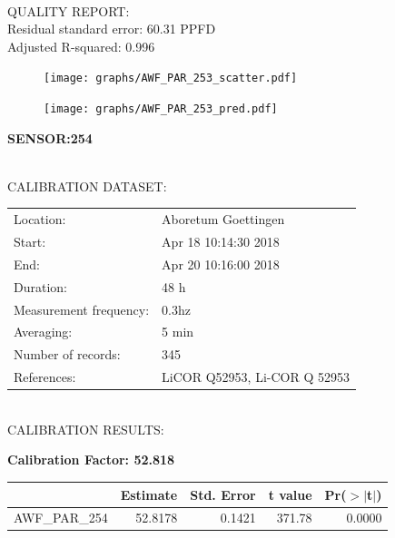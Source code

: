 \documentclass[oneside]{report}
\begin{document}
\hrulefill\\
QUALITY REPORT:\\
Residual standard error: 60.31 PPFD\\
Adjusted R-squared: 0.996



\begin{figure}[H]
  \centering
  \texttt{[image: graphs/AWF\_PAR\_253\_scatter.pdf]}
\end{figure}




\begin{figure}[H]
  \centering
  \texttt{[image: graphs/AWF\_PAR\_253\_pred.pdf]}
\end{figure}

\pagebreak


\begin{center}
\large{\textbf{SENSOR:254}}\\
\end{center}

\hrulefill\\
CALIBRATION DATASET:\\
\begin{table}[h!]
  \centering
  \label{tab:table1}
  \begin{tabular}{ll}
    Location: & Aboretum Goettingen\\ 
    
    
    Start:  & Apr 18 10:14:30 2018 \\
    End:   & Apr 20 10:16:00 2018\\ 
    Duration: & 48 h\\
    Measurement frequency: & 0.3hz\\
    Averaging:  &5 min\\
    Number of records: & 345 \\
    References: & LiCOR Q52953, Li-COR Q 52953 \\
  \end{tabular}
\end{table}

\hrulefill\\
CALIBRATION RESULTS:\\


\begin{center}
\textbf{\large{Calibration Factor: 52.818}}\\
\end{center}
\begin{table}[ht]
\centering
\begin{tabular}{rrrrr}
  \hline
 & Estimate & Std. Error & t value & Pr($>$$|$t$|$) \\ 
  \hline
AWF\_PAR\_254 & 52.8178 & 0.1421 & 371.78 & 0.0000 \\ 
   \hline
\end{tabular}
\end{table}
\end{document}
